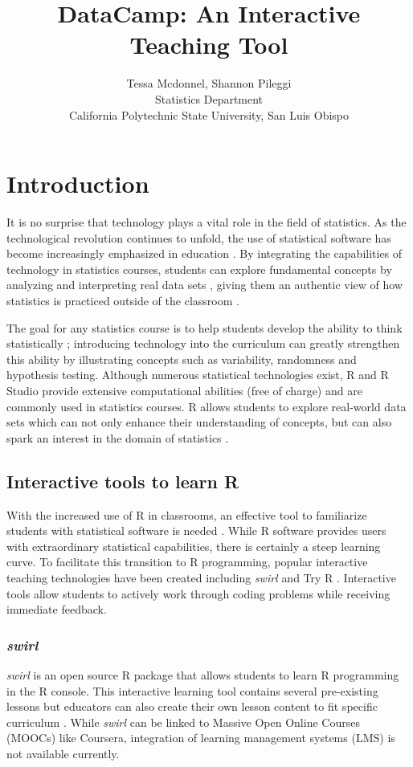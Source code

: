 \documentclass[12pt]{article}\usepackage[]{graphicx}\usepackage[]{color}
\title{DataCamp: An Interactive Teaching Tool}
\author{Tessa Mcdonnel, Shannon Pileggi \\Statistics Department \\ California Polytechnic State University, San Luis Obispo}
\begin{document}
\maketitle

\section{Introduction}

\doublespacing

It is no surprise that technology plays a vital role in the field of statistics. As the technological revolution continues to
unfold, the use of statistical software has become increasingly emphasized in education \citep{AmericanStatisticalAssociation2016}. By integrating the
capabilities of technology in statistics courses, students can explore fundamental concepts by analyzing and
interpreting real data sets \citep{Chance2007, Hardin2015, Horton2014}, giving them an authentic view of how statistics is practiced outside of the
classroom \citep{Wang2017}.

The goal for any statistics course is to help students develop the ability to think statistically
\citep{AmericanStatisticalAssociation2016}; introducing technology into the curriculum can greatly strengthen this ability by illustrating concepts such as
variability, randomness and hypothesis testing. Although numerous statistical technologies exist, R and R Studio
provide extensive computational abilities (free of charge) and are commonly used in statistics courses. R
allows students to explore real-world data sets which can not only enhance their understanding of concepts, but can also spark
an interest in the domain of statistics \citep{Wang2017}.


\subsection{Interactive tools to learn R}
With the increased use of R in classrooms, an effective tool to familiarize students with statistical software is needed
\citep{Baumer2014}. While R software provides users with extraordinary statistical capabilities, there is certainly a steep learning curve. To facilitate
this transition to R programming, popular interactive teaching technologies have been created including \textit{swirl} \citep{Kross} and Try R \citep{TryR}. 
Interactive tools allow students to actively work through coding problems while receiving immediate feedback.

\subsubsection{\textit{swirl}}
\textit{swirl} \citep{Kross} is an
open source R package that allows students to learn R programming in the R console. This interactive learning tool
contains several pre-existing lessons but educators can also create their own
lesson content to fit specific curriculum \citep{Carchedi2014}.
While \textit{swirl} can be linked to Massive Open Online Courses (MOOCs) like Coursera, integration of learning management 
systems (LMS) is not available currently. 
\end{document}
